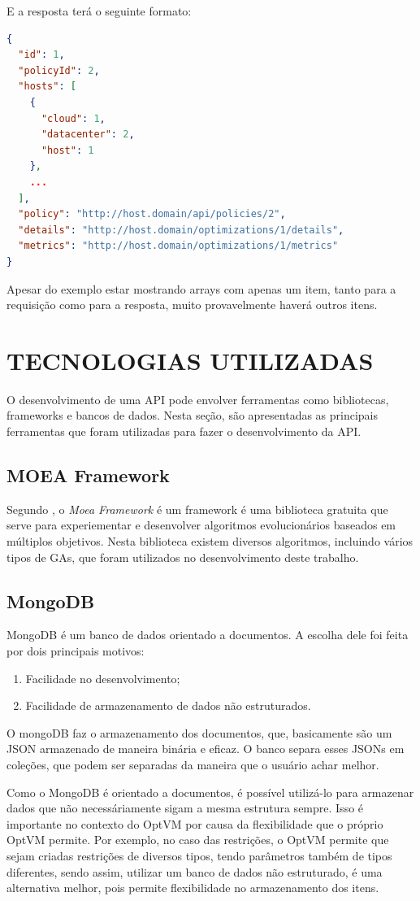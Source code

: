 E a resposta terá o seguinte formato:

\begin{lstlisting}[language=json,firstnumber=1]
{
  "id": 1,
  "policyId": 2,
  "hosts": [
    {
      "cloud": 1,
      "datacenter": 2,
      "host": 1
    }, 
    ...
  ],
  "policy": "http://host.domain/api/policies/2",
  "details": "http://host.domain/optimizations/1/details",
  "metrics": "http://host.domain/optimizations/1/metrics"
}
\end{lstlisting}

Apesar do exemplo estar mostrando arrays com apenas um item,
tanto para a requisição como para a resposta, muito provavelmente 
haverá outros itens.

\section{TECNOLOGIAS UTILIZADAS}

O desenvolvimento de uma API pode envolver ferramentas como bibliotecas, frameworks e 
bancos de dados. Nesta seção, são apresentadas as principais ferramentas que foram utilizadas para
fazer o desenvolvimento da API. 

\subsection{MOEA Framework}
Segundo \cite{moea}, o \textit{Moea Framework} é um framework é uma
biblioteca gratuita que serve para experiementar e desenvolver
algoritmos evolucionários baseados em múltiplos objetivos. Nesta biblioteca
existem diversos algoritmos, incluindo vários tipos de GAs, que foram utilizados
no desenvolvimento deste trabalho.

\subsection{MongoDB}
MongoDB é um banco de dados orientado a documentos. A escolha dele foi
feita por dois principais motivos:

\begin{enumerate}
  \item Facilidade no desenvolvimento;
  \item Facilidade de armazenamento de dados não estruturados.
\end{enumerate}

O mongoDB faz o armazenamento dos documentos, que, basicamente são um JSON
armazenado de maneira binária e eficaz. O banco separa esses JSONs em coleções,
que podem ser separadas da maneira que o usuário achar melhor.

Como o MongoDB é orientado a documentos, é possível utilizá-lo para armazenar
dados que não necessáriamente sigam a mesma estrutura sempre. Isso é importante no contexto do
OptVM por causa da flexibilidade que o próprio OptVM permite. Por exemplo, no
caso das restrições, o OptVM permite que sejam criadas restrições de diversos tipos,
tendo parâmetros também de tipos diferentes, sendo assim, utilizar um banco de 
dados não estruturado, é uma alternativa melhor, pois permite flexibilidade no armazenamento
dos itens.
